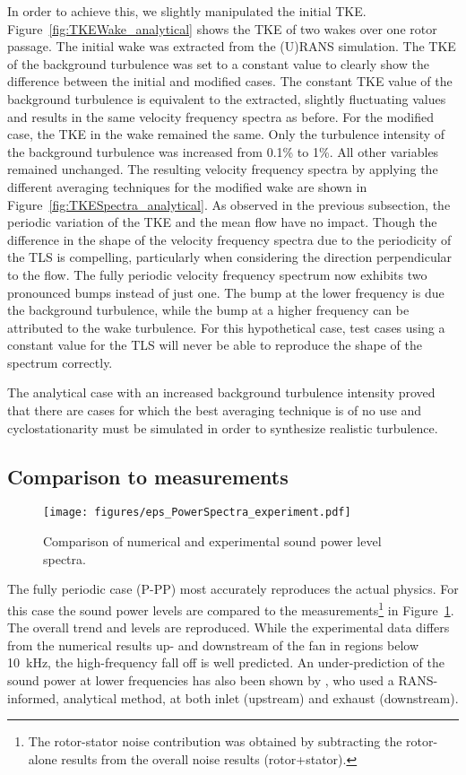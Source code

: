 In order to achieve this, we slightly manipulated the initial TKE.  Figure~\ref{fig:TKEWake_analytical} shows the TKE of two wakes over one rotor passage.  The initial wake was extracted from the (U)RANS simulation.  The TKE of the background turbulence was set to a constant value to clearly show the difference between the initial and modified cases.  The constant TKE value of the background turbulence is equivalent to the extracted, slightly fluctuating values and results in the same velocity frequency spectra as before.  For the modified case, the TKE in the wake remained the same.  Only the turbulence intensity of the background turbulence was increased from 0.1\% to 1\%.  All other variables remained unchanged.  The resulting velocity frequency spectra by applying the different averaging techniques for the modified wake are shown in Figure~\ref{fig:TKESpectra_analytical}.  As observed in the previous subsection, the periodic variation of the TKE and the mean flow have no impact.  Though the difference in the shape of the velocity frequency spectra due to the periodicity of the TLS is compelling, particularly when considering the direction perpendicular to the flow.  The fully periodic velocity frequency spectrum now exhibits two pronounced bumps instead of just one.  The bump at the lower frequency is due the background turbulence, while the bump at a higher frequency can be attributed to the wake turbulence.  For this hypothetical case, test cases using a constant value for the TLS will never be able to reproduce the shape of the spectrum correctly.


The analytical case with an increased background turbulence intensity proved that there are cases for which the best averaging technique is of no use and cyclostationarity must be simulated in order to synthesize realistic turbulence.      



\subsection{Comparison to measurements}
\label{sec:meas}
\begin{figure}
\centering
\texttt{[image: figures/eps\_PowerSpectra\_experiment.pdf]} 
\caption{Comparison of numerical and experimental sound power level spectra. \label{fig:PowerSpectraExp} }
\end{figure}
The fully periodic case (P-PP) most accurately reproduces the actual physics.  
For this case the sound power levels are compared to the measurements\footnote{The rotor-stator noise contribution was obtained by subtracting the rotor-alone results from the overall noise results (rotor+stator).} in Figure~\ref{fig:PowerSpectraExp}. The overall trend and levels are reproduced.  While the experimental data differs from the numerical results up- and downstream of the fan in regions below \SI{10}{kHz}, the high-frequency fall off is well predicted. An under-prediction of the sound power at lower frequencies has also been shown by \citet{nallasamy_computation_2005}, who used a RANS-informed, analytical method, at both inlet (upstream) and exhaust (downstream). %


